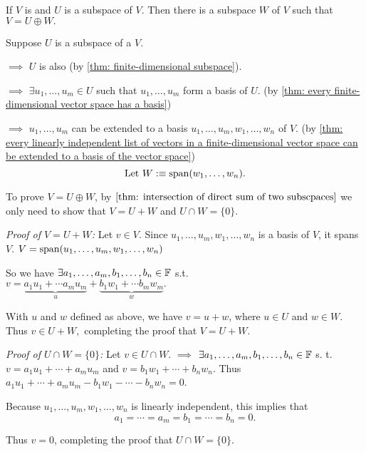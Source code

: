 \begin{thm} 
  \label{thm: every subspace of V is part of a direct sum equal to V}
  If $V$ is \fd and $U$ is a subspace of $V$. Then there is a subspace $W$ of $V$ such that $V=U \oplus W.$
\end{thm}
\begin{prf}
  Suppose $U$ is a subspace of a \fdvs $V$. 
  
  $\implies$ $U$ is also \fd (by \ref{thm: finite-dimensional subspace}). 
  
  $\implies$ $\exists u_1, \ldots, u_m \in U $ such that $u_1, \ldots, u_m $ form a basis of $U$. (by \ref{thm: every finite-dimensional vector space has a basis}) 
  
  $\implies$ $u_1, \ldots, u_m$ can be extended to a basis $u_1, \ldots, u_m, w_1, \ldots, w_n$ of $V$. (by \ref{thm: every linearly independent list of vectors in a finite-dimensional vector space can be extended to a basis of the vector space})
  \begin{equation}
    $Let $W :\equiv \myspan{w_1, \ldots, w_n}.
  \end{equation}
  
  To prove $V=U\oplus W$, by $\ref{thm: intersection of direct sum of two subscpaces}$ we only need to show that $V = U+W$ and $U \cap W = \{0\}$.

  
  \begin{description}
    \item{\emph{Proof of $V=U+W$:}} Let $v \in V$. Since $u_1, \ldots, u_m, w_1, \ldots, w_n$ is a basis of $V$, it spans $V$. $V = \operatorname{span} (u_1, \ldots, u_m, w_1, \ldots, w_n)$
    
    So we have $\exists a_1, \ldots, a_m, b_1, \ldots, b_n \in \mathbb{F}$ s.t. \\
    $v = \underbrace{a_1 u_1 + \cdots a_m u_m}_{u} + \underbrace{b_1 w_1 + \cdots b_m w_m}_{w}.$
    
    With $u$ and $w$ defined as above, we have $v=u+w$, where $u \in U$ and $w \in W$. Thus $v \in U+W,$ completing the proof that $V=U+W$.
    
    \item{\emph{Proof of $U \cap W = \{0\}$:}} Let $v \in U \cap W$. $\implies$ $\exists a_1, \ldots, a_m, b_1, \ldots, b_n \in \mathbb{F}$ s. t. $v= a_1 u _1 + \cdots + a_m u_m$ and $v= b_1 w_1 + \cdots + b_n w_n$. Thus $a_1 u_1 + \cdots + a_m u_m - b_1 w_1 - \cdots - b_n w_n = 0$.
    
    Because $u_1, \ldots, u_m, w_1, \ldots, w_n$ is linearly independent, this implies that
    \begin{equation}
      a_1 = \cdots = a_m = b_1 = \cdots= b_n = 0.
    \end{equation}
    
    Thus $v=0$, completing the proof that $U\cap W = \{0\}.$
    
  \end{description}
  \vspace{-1em}
\end{prf}

